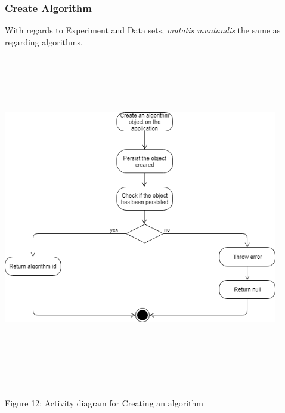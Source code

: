 	\subsubsection{Create Algorithm}
    \par With regards to Experiment and Data sets,
{ \textit{mutatis muntandis} the same as regarding algorithms.} \newline \newline
    \includegraphics[width=12cm,height=15cm,keepaspectratio]{input_unit/images/create_algorithm_activity_diagram.png}
	\begin{center}
	    \small{Figure 12: Activity diagram for Creating an algorithm }
    \end{center}
    \newpage
